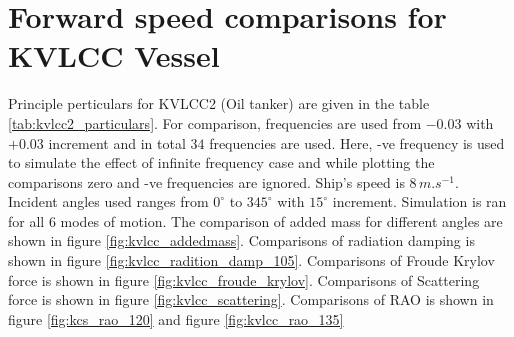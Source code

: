 \section{Forward speed comparisons for KVLCC Vessel}
Principle perticulars for KVLCC2 (Oil tanker) are given in the table \ref{tab:kvlcc2_particulars}.
For comparison, frequencies are used from
$-0.03$ with $+0.03$ increment and in total $34$ frequencies are used. Here, -ve frequency is 
used to simulate the effect of infinite frequency case and while plotting the comparisons
zero and -ve frequencies are ignored.
Ship's speed is $8\,\si{m.s^{-1}}$. 
Incident angles used 
ranges from $0^{\circ}$ to $345^{\circ}$ with $15^{\circ}$ increment. Simulation is ran for all 6 modes of motion.  
The comparison of added mass for different angles are shown in figure \ref{fig:kvlcc_addedmass}.
Comparisons of radiation damping is shown in figure \ref{fig:kvlcc_radition_damp_105}. 
Comparisons of Froude Krylov force is shown in figure \ref{fig:kvlcc_froude_krylov}.
Comparisons of Scattering force is shown in figure \ref{fig:kvlcc_scattering}. 
Comparisons of RAO is shown in figure \ref{fig:kcs_rao_120}
and figure \ref{fig:kvlcc_rao_135}
\\[1.5cm]

\begin{table}[h]
    \label{tab:kvlcc2_particulars}
\end{table}
